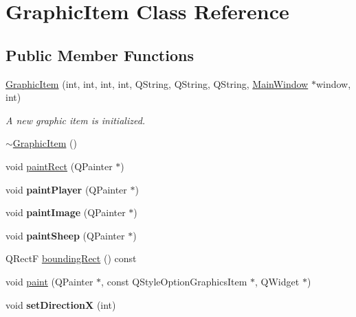 \hypertarget{classGraphicItem}{
\section{GraphicItem Class Reference}
\label{classGraphicItem}
}
\subsection*{Public Member Functions}
\begin{DoxyCompactItemize}
\item 
\hyperlink{classGraphicItem_ae39c9ddf5168c365138540e010ca6d8f}{GraphicItem} (int, int, int, int, QString, QString, QString, \hyperlink{classMainWindow}{MainWindow} $\ast$window, int)
\begin{DoxyCompactList}\small\item\em A new graphic item is initialized. \item\end{DoxyCompactList}\item 
\hyperlink{classGraphicItem_aa502ffe9cf1bc733f5d21f14adf31670}{$\sim$GraphicItem} ()
\item 
void \hyperlink{classGraphicItem_af9b320053cd99e8c787bdf782c032624}{paintRect} (QPainter $\ast$)
\item 
\hypertarget{classGraphicItem_a76cc0212587517426539b10fc4c0cb31}{
void {\bfseries paintPlayer} (QPainter $\ast$)}
\label{classGraphicItem_a76cc0212587517426539b10fc4c0cb31}

\item 
\hypertarget{classGraphicItem_ab52357614772dfcb19027b4dae5ea987}{
void {\bfseries paintImage} (QPainter $\ast$)}
\label{classGraphicItem_ab52357614772dfcb19027b4dae5ea987}

\item 
\hypertarget{classGraphicItem_af3bc35e6c2579eaa3d29de2ed0d2f19e}{
void {\bfseries paintSheep} (QPainter $\ast$)}
\label{classGraphicItem_af3bc35e6c2579eaa3d29de2ed0d2f19e}

\item 
QRectF \hyperlink{classGraphicItem_a28dba31cb866a341260ff96d431ed474}{boundingRect} () const 
\item 
void \hyperlink{classGraphicItem_a0cca6d18934673ed5e132951770b0900}{paint} (QPainter $\ast$, const QStyleOptionGraphicsItem $\ast$, QWidget $\ast$)
\item 
\hypertarget{classGraphicItem_a0fd981c786fa13c9276d918afc9601b1}{
void {\bfseries setDirectionX} (int)}
\label{classGraphicItem_a0fd981c786fa13c9276d918afc9601b1}


\end{DoxyCompactItemize}
